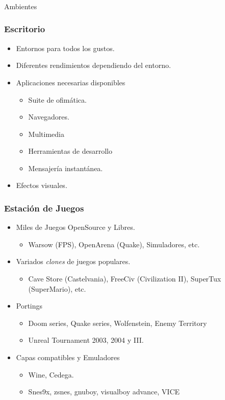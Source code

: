 \frame
{
\frametitle{}
\begin{center}
	\Huge{Ambientes}
\end{center}
}

\frame
{
\frametitle{Escritorio}
\begin{itemize}
	\item Entornos para todos los gustos.
	\item Diferentes rendimientos dependiendo del entorno.
	\item Aplicaciones necesarias disponibles
	\begin{itemize}
		\item Suite de ofimática.
		\item Navegadores.
		\item Multimedia
		\item Herramientas de desarrollo
		\item Mensajería instantánea.
	\end{itemize}
	\item Efectos visuales.
\end{itemize}
}

\frame
{
\frametitle{Estación de Juegos}
\begin{itemize}
	\item Miles de Juegos OpenSource y Libres.
	\begin{itemize}
		\item Warsow (FPS), OpenArena (Quake), Simuladores, etc.
	\end{itemize}
	\item Variados \emph{clones} de juegos populares.
	\begin{itemize}
		\item Cave Store (Castelvania), FreeCiv (Civilization II), SuperTux (SuperMario), etc.
	\end{itemize}
	\item Portings
	\begin{itemize}
		\item Doom series, Quake series, Wolfenstein, Enemy Territory
		\item Unreal Tournament 2003, 2004  y III.
	\end{itemize}
	\item Capas compatibles y Emuladores
	\begin{itemize}
		\item Wine, Cedega.
		\item Snes9x, zsnes, gnuboy, visualboy advance, VICE
	\end{itemize}
\end{itemize}
}

